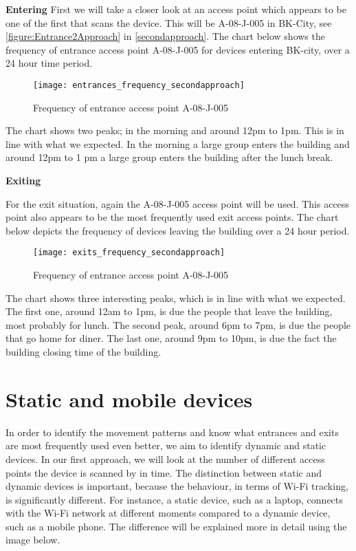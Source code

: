 \textbf{Entering}
First we will take a closer look at an access point which appears to be one of the first that scans the device. This will be A-08-J-005 in BK-City, see \autoref{figure:Entrance2Approach} in \autoref{secondapproach}. The chart below shows the frequency of entrance access point A-08-J-005 for devices entering BK-city, over a 24 hour time period. 

\begin{figure}[H]
\centering
\texttt{[image: entrances\_frequency\_secondapproach]}
\captionsetup{justification=centering}
\caption{Frequency of entrance access point A-08-J-005
}
\label{figure:A-08-J-005Entrance}
\end{figure}

The chart shows two peaks; in the morning and around 12pm to 1pm. This is in line with what we expected. In the morning a large group enters the building and around 12pm to 1 pm a large group enters the building after the lunch break. 

\textbf{Exiting}

For the exit situation, again the A-08-J-005 access point will be used. This access point also appears to be the most frequently used exit access points. The chart below depicts the frequency of devices leaving the building over a 24 hour period.

\begin{figure}[H]
\centering
\texttt{[image: exits\_frequency\_secondapproach]}
\captionsetup{justification=centering}
\caption{Frequency of entrance access point A-08-J-005
}
\label{figure:A-08-J-005Exit}
\end{figure}

The chart shows three interesting peaks, which is in line with what we expected. The first one, around 12am to 1pm, is due the people that leave the building, most probably for lunch. The second peak, around 6pm to 7pm, is due the people that go home for diner. The last one, around 9pm to 10pm, is due the fact the building closing time of the building.

\section{Static and mobile devices}\label{Static and mobile devices}

In order to identify the movement patterns and know what entrances and exits are most frequently used even better, we aim to identify dynamic and static devices. In our first approach, we will look at the number of different access points the device is scanned by in time. The distinction between static and dynamic devices is important, because the behaviour, in terms of Wi-Fi tracking, is significantly different. For instance, a static device, such as a laptop, connects with the Wi-Fi network at different moments compared to a dynamic device, such as a mobile phone. The difference will be explained more in detail using the image below. 

